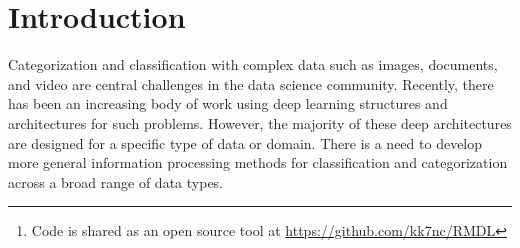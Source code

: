 \documentclass[sigconf, final]{acmart}
\begin{document}
\begin{abstract}
The continually increasing number of complex datasets each year necessitates ever improving machine learning methods for robust and accurate categorization of these data. This paper introduces Random Multimodel Deep Learning~(RMDL): a new ensemble, deep learning approach for classification. Deep learning models have achieved state-of-the-art results across many domains.  RMDL solves the problem of finding the best deep learning structure and architecture while simultaneously improving robustness and accuracy through ensembles of deep learning architectures. RDML can accept as input a variety data to include text, video, images, and symbolic. This paper describes RMDL and shows test results for image and text data including MNIST, CIFAR-10, WOS, Reuters, IMDB, and 20newsgroup. These test results show that RDML produces consistently better performance than standard methods over a broad range of data types and classification problems.\footnote{Code is shared as an open source tool at \url{https://github.com/kk7nc/RMDL}}
\end{abstract}

%
%






\maketitle

\section{Introduction}\label{sec:introduction}
Categorization and classification with complex data such as images, documents, and video are central challenges in the data science community. Recently, there has been an increasing body of work using deep learning structures and architectures for such problems. %
However, the majority of these deep architectures are designed for a specific type of data or domain. There is a need to develop more general information processing methods for classification and categorization across a broad range of data types. 
\end{document}
